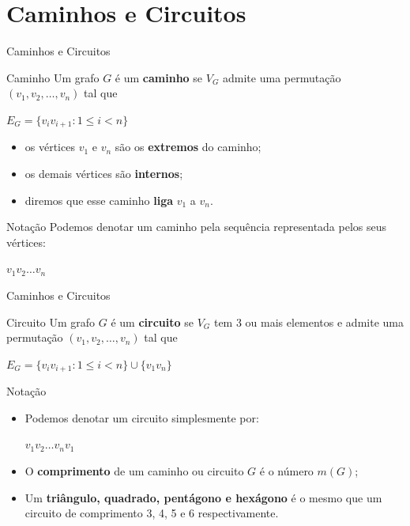 \documentclass[xcolor=dvipsnames,table]{beamer}
\begin{document}
	\section{Caminhos e Circuitos}
	\begin{frame}[shrink]{Caminhos e Circuitos}
		\begin{block}{Caminho}
			Um grafo $G$ é um {\bf caminho} se $V_G$ admite uma permutação $(v_1, v_2, \ldots , v_n)$ tal que
			\begin{center}
				$E_G = \{ v_i v_{i +1} : 1 \leq i < n \}$
			\end{center} \pause
			\begin{itemize}
				\item os vértices $v_1$ e $v_n$ são os {\bf extremos} do caminho; \pause
				\item os demais vértices são {\bf internos}; \pause
				\item diremos que esse caminho {\bf liga} $v_1$ a $v_n$.
			\end{itemize}
		\end{block} \pause
		\begin{block}{Notação}
			Podemos denotar um caminho pela sequência representada pelos seus vértices: \pause
			\begin{center}
				$v_1 v_2 \ldots v_n$		
			\end{center}
		\end{block}
	\end{frame}
	
	\begin{frame}[shrink]{Caminhos e Circuitos}
		\begin{block}{Circuito}
			Um grafo $G$ é um {\bf circuito} se $V_G$ tem 3 ou mais elementos e admite uma permutação $(v_1, v_2, \ldots , v_n)$ tal que
			\begin{center}
				$E_G = \{ v_i v_{i +1} : 1 \leq i < n \} \cup \{ v_1 v_n \}$
			\end{center} 
		\end{block} \pause
		\begin{block}{Notação}
			\begin{itemize}
				\item Podemos denotar um circuito simplesmente por: \pause
					\begin{center}
						$v_1 v_2 \ldots v_n v_1$		
					\end{center}
				\item O {\bf comprimento} de um caminho ou circuito $G$ é o número $m(G)$; \pause
				\item Um {\bf triângulo, quadrado, pentágono {e} hexágono} é o mesmo que um circuito de comprimento 3, 4, 5 e 6 respectivamente.
			\end{itemize}
		\end{block}
	\end{frame}
	
\end{document}
